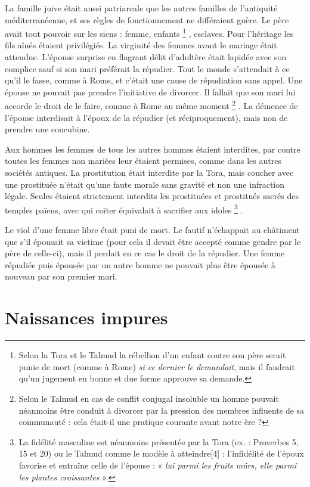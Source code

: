  La famille juive était aussi patriarcale que les autres familles de l'antiquité méditerranéenne, et ses règles de fonctionnement ne différaient guère. Le père avait tout pouvoir sur les siens : femme, enfants%
\footnote{Selon la Tora et le Talmud la rébellion d'un enfant contre son père serait punie de mort (comme à Rome) \emph{si ce dernier le demandait}, mais il faudrait qu'un jugement en bonne et due forme approuve sa demande.}%
, esclaves. Pour l'héritage les fils aînés étaient privilégiés. La virginité des femmes avant le mariage était attendue. L'épouse surprise en flagrant délit d'adultère était lapidée avec son complice sauf si son mari préférait la répudier. Tout le monde s'attendait à ce qu'il le fasse, comme à Rome, et c'était une cause de répudiation sans appel. Une épouse ne pouvait pas prendre l'initiative de divorcer. Il fallait que son mari lui accorde le droit de le faire, comme à Rome au même moment%
\footnote{Selon le Talmud en cas de conflit conjugal insoluble un homme pouvait néanmoins être conduit à divorcer par la pression des membres influents de sa communauté : cela était-il une pratique courante avant notre ère ?}%
. La démence de l'épouse interdisait à l'époux de la répudier (et réciproquement), mais non de prendre une concubine. 

 Aux hommes les femmes de tous les autres hommes étaient interdites, par contre toutes les femmes non mariées leur étaient permises, comme dans les autres sociétés antiques. La prostitution était interdite par la Tora, mais coucher avec une prostituée n'était qu'une faute morale sans gravité et non une infraction légale. Seules étaient strictement interdits les prostituées et prostitués sacrés des temples païens, avec qui coïter équivalait à sacrifier aux idoles%
\footnote{La fidélité masculine est néanmoins présentée par la Tora (ex. : Proverbes 5, 15 et 20) ou le Talmud comme le modèle à atteindre[4] : l'infidélité de l'époux favorise et entraîne celle de l'épouse : « \emph{lui parmi les fruits mûrs, elle parmi les plantes croissantes} ».}%
. 

 Le viol d'une femme libre était puni de mort. Le fautif n'échappait au châtiment que s'il épousait sa victime (pour cela il devait être accepté comme gendre par le père de celle-ci), mais il perdait en ce cas le droit de la répudier. Une femme répudiée puis épousée par un autre homme ne pouvait plus être épousée à nouveau par son premier mari. 

\section{Naissances impures}

